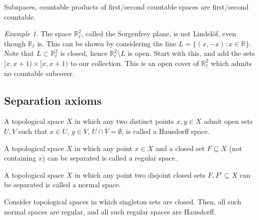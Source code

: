 \documentclass[11pt]{article}
\newcommand{\R}{\mathbb{R}}
\theoremstyle{definition}
\theoremstyle{remark}
\newtheorem*{example}{Example}
\numberwithin{equation}{section}
\begin{document}
    \begin{lemma}
        Subspaces, countable products of first/second countable spaces are
        first/second countable.
    \end{lemma}

    \begin{example}
        The space $\R_\ell^2$, called the Sorgenfrey plane, is not Lindel\"of, even
        though $\R_\ell$ is. This can be shown by considering the line $L = \{(x,
        -x): x \in \R\}$. Note that $L \subset \R_\ell^2$ is closed, hence $\R_\ell^2
        \setminus L$ is open. Start with this, and add the sets $[x, x + 1)\times [x,
        x + 1)$ to our collection. This is an open cover of $\R_\ell^2$ which admits
        no countable subcover.
    \end{example}


    \subsection{Separation axioms}

    \begin{definition}
        A topological space $X$ in which any two distinct points $x, y \in X$ admit
        open sets $U, V$ such that $x \in U$, $y \in V$, $U \cap V = \emptyset$, is
        called a Hausdorff space.
    \end{definition}

    \begin{definition}
        A topological space $X$ in which any point $x \in X$ and a closed set
        $F\subseteq X$ (not containing $x$) can be separated is called a regular
        space.
    \end{definition}
    
    \begin{definition}
        A topological space $X$ in which any point two disjoint closed sets $F, F'
        \subseteq X$ can be separated is called a normal space.
    \end{definition}

    \begin{lemma}
        Consider topological spaces in which singleton sets are closed. Then, all
        such normal spaces are regular, and all such regular spaces are Hausdorff.
    \end{lemma}
    
\end{document}
